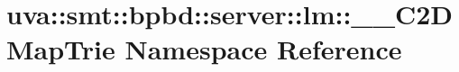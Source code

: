 \hypertarget{namespaceuva_1_1smt_1_1bpbd_1_1server_1_1lm_1_1_____c2_d_map_trie}{}\section{uva\+:\+:smt\+:\+:bpbd\+:\+:server\+:\+:lm\+:\+:\+\_\+\+\_\+\+C2\+D\+Map\+Trie Namespace Reference}
\label{namespaceuva_1_1smt_1_1bpbd_1_1server_1_1lm_1_1_____c2_d_map_trie}
